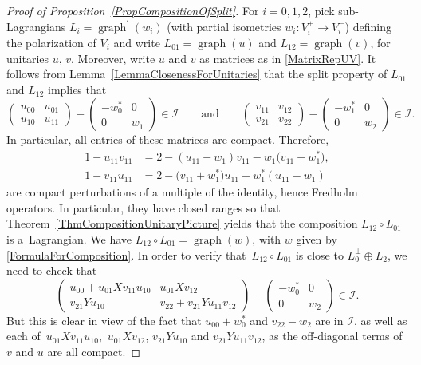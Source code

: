 \documentclass[10pt,a4paper]{amsart}
\numberwithin{equation}{section}
\DeclareMathOperator{\graph}{\mathrm{graph}}
\begin{document}
\begin{proof}[Proof of Proposition~\ref{PropCompositionOfSplit}]
For $i = 0, 1, 2$, pick sub-Lagrangians $L_i = \graph^\prime(w_i)$ (with partial isometries $w_i\colon V_i^+ \to V_i^-$) defining the polarization of $V_i$ and write
$L_{01} = \graph(u)$ and ${L_{12} = \graph(v)}$, for unitaries $u$, $v$.
Moreover, write $u$ and $v$ as matrices as in \eqref{MatrixRepUV}.
It follows from Lemma~\ref{LemmaClosenessForUnitaries} that the split property of $L_{01}$ and $L_{12}$ implies that
\begin{equation} \label{ConditionTwo}
\begin{pmatrix} u_{00} & u_{01} \\ u_{10} & u_{11} \end{pmatrix} - \begin{pmatrix} -w_0^* & 0 \\ 0 & w_1 \end{pmatrix} \in \mathcal{I} \qquad \text{and}\qquad
\begin{pmatrix} v_{11} & v_{12} \\ v_{21} & v_{22} \end{pmatrix} - \begin{pmatrix} -w_1^* & 0 \\ 0 & w_2 \end{pmatrix} \in \mathcal{I}.
\end{equation}
In particular, all entries of these matrices are compact.
Therefore,
\begin{align*}
 1 - u_{11} v_{11} &= 2 - (u_{11} - w_1)v_{11} - w_1\bigl(v_{11} +w_1^*\bigr),\\
 1 - v_{11} u_{11} &= 2 - \bigl(v_{11} + w_1^*\bigr) u_{11} + w_1^*(u_{11} - w_1)
\end{align*}
are compact perturbations of a multiple of the identity, hence Fredholm operators.
In particular, they have closed ranges so that Theorem~\ref{ThmCompositionUnitaryPicture} yields that the composition $L_{12} \circ L_{01}$ is a~Lagrangian.
We have $L_{12} \circ L_{01} = \graph(w)$, with $w$ given by \eqref{FormulaForComposition}.
In order to verify that~${L_{12} \circ L_{01}}$ is close to $L_0^\perp \oplus L_2$, we need to check that
\begin{equation*}
\begin{pmatrix} u_{00} + u_{01}X v_{11} u_{10} & u_{01} X v_{12} \\
 v_{21}Y u_{10} & v_{22} + v_{21}Y u_{11}v_{12} \end{pmatrix}
 - \begin{pmatrix} -w_0^* & 0 \\ 0 & w_2 \end{pmatrix} \in \mathcal{I}.
\end{equation*}
But this is clear in view of the fact that $u_{00} + w_0^*$ and $v_{22} - w_2$ are in $\mathcal{I}$, as well as each of~$u_{01}X v_{11} u_{10}$,~$u_{01} X v_{12}$, $v_{21}Y u_{10}$ and $v_{21}Y u_{11}v_{12}$, as the off-diagonal terms of $v$ and $u$ are all compact.
\end{proof}
\end{document}
